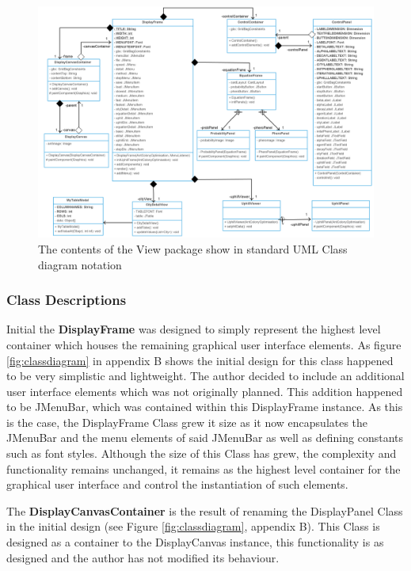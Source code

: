 \clearpage
\begin{figure}
\includegraphics[scale=0.225]{Images/chapter4/view}
\caption{The contents of the View package show in standard UML Class diagram notation}
\label{fig:classdiagramImp}
\end{figure}
\clearpage

\subsubsection{Class Descriptions}

Initial the \textbf{DisplayFrame} was designed to simply represent the highest level container which houses the remaining graphical user interface elements. As figure \ref{fig:classdiagram} in appendix B shows the initial design for this class happened to be very simplistic and lightweight. The author decided to include an additional user interface elements which was not originally planned. This addition happened to be JMenuBar, which was contained within this DisplayFrame instance. As this is the case, the DisplayFrame Class grew it size as it now encapsulates the JMenuBar and the menu elements of said JMenuBar as well as defining constants such as font styles. Although the size of this Class has grew, the complexity and functionality remains unchanged, it remains as the highest level container for the graphical user interface and control the instantiation of such elements.

The \textbf{DisplayCanvasContainer} is the result of renaming the DisplayPanel Class in the initial design (see Figure \ref{fig:classdiagram}, appendix B). This Class is designed as a container to the DisplayCanvas instance, this functionality is as designed and the author has not modified its behaviour.

